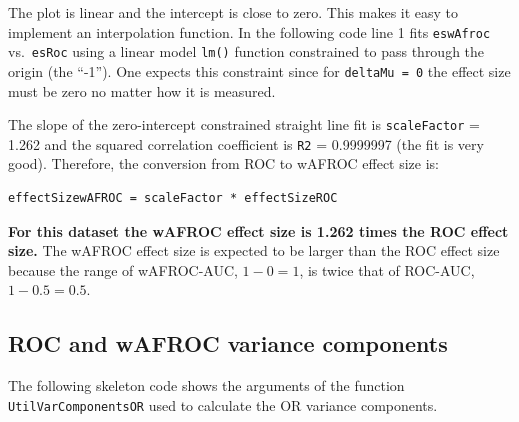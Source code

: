 \documentclass[
]{book}
\newenvironment{Shaded}{\begin{snugshade}}{\end{snugshade}}
\newcommand{\CommentTok}[1]{\textcolor[rgb]{0.56,0.35,0.01}{\textit{#1}}}
\newcommand{\DecValTok}[1]{\textcolor[rgb]{0.00,0.00,0.81}{#1}}
\newcommand{\FloatTok}[1]{\textcolor[rgb]{0.00,0.00,0.81}{#1}}
\newcommand{\FunctionTok}[1]{\textcolor[rgb]{0.00,0.00,0.00}{#1}}
\newcommand{\NormalTok}[1]{#1}
\newcommand{\OtherTok}[1]{\textcolor[rgb]{0.56,0.35,0.01}{#1}}
\newcommand{\SpecialCharTok}[1]{\textcolor[rgb]{0.00,0.00,0.00}{#1}}
\begin{document}
The plot is linear and the intercept is close to zero. This makes it easy to implement an interpolation function. In the following code line 1 fits \texttt{eswAfroc} vs.~\texttt{esRoc} using a linear model \texttt{lm()} function constrained to pass through the origin (the ``-1''). One expects this constraint since for \texttt{deltaMu\ =\ 0} the effect size must be zero no matter how it is measured.

\begin{Shaded}
\end{Shaded}

The slope of the zero-intercept constrained straight line fit is \texttt{scaleFactor} = 1.262 and the squared correlation coefficient is \texttt{R2} = 0.9999997 (the fit is very good). Therefore, the conversion from ROC to wAFROC effect size is:

\begin{verbatim}
effectSizewAFROC = scaleFactor * effectSizeROC
\end{verbatim}

\textbf{For this dataset the wAFROC effect size is 1.262 times the ROC effect size.} The wAFROC effect size is expected to be larger than the ROC effect size because the range of wAFROC-AUC, \(1-0=1\), is twice that of ROC-AUC, \(1-0.5=0.5\).

\hypertarget{roc-and-wafroc-variance-components}{%
\subsection{ROC and wAFROC variance components}\label{roc-and-wafroc-variance-components}}

The following skeleton code shows the arguments of the function \texttt{UtilVarComponentsOR} used to calculate the OR variance components.
\end{document}
